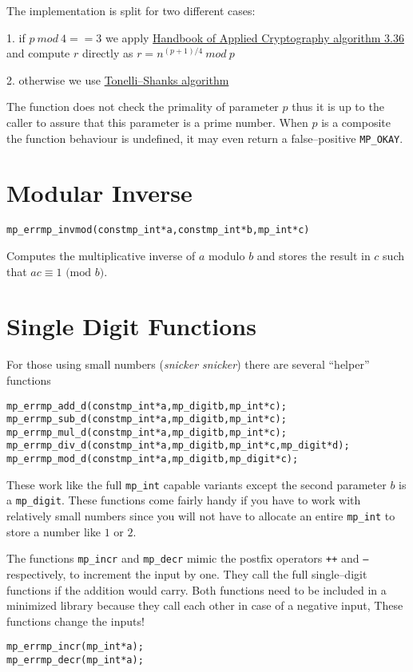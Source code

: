 \documentclass[synpaper]{book}
\def\mod{{\mathit\ mod\ }}
\begin{document}
The implementation is split for two different cases:

1. if $p \mod 4 == 3$ we apply \href{http://cacr.uwaterloo.ca/hac/}{Handbook of Applied
  Cryptography algorithm 3.36} and compute $r$ directly as $r = n^{(p+1)/4} \mod p$

2. otherwise we use \href{https://en.wikipedia.org/wiki/Tonelli-Shanks_algorithm}{Tonelli--Shanks
  algorithm}

The function does not check the primality of parameter $p$ thus it is up to the caller to assure
that this parameter is a prime number. When $p$ is a composite the function behaviour is undefined,
it may even return a false--positive \texttt{MP\_OKAY}.

\section{Modular Inverse}
\begin{alltt}
mp_err mp_invmod (const mp_int *a, const mp_int *b, mp_int *c)
\end{alltt}
Computes the multiplicative inverse of $a$ modulo $b$ and stores the result in $c$ such that
$ac \equiv 1 \mbox{ (mod }b\mbox{)}$.

\section{Single Digit Functions}

For those using small numbers (\textit{snicker snicker}) there are several ``helper'' functions

    
\begin{alltt}
mp_err mp_add_d(const mp_int *a, mp_digit b, mp_int *c);
mp_err mp_sub_d(const mp_int *a, mp_digit b, mp_int *c);
mp_err mp_mul_d(const mp_int *a, mp_digit b, mp_int *c);
mp_err mp_div_d(const mp_int *a, mp_digit b, mp_int *c, mp_digit *d);
mp_err mp_mod_d(const mp_int *a, mp_digit b, mp_digit *c);
\end{alltt}

These work like the full \texttt{mp\_int} capable variants except the second parameter $b$ is a
\texttt{mp\_digit}.  These functions come fairly handy if you have to work with relatively small numbers
since you will not have to allocate an entire \texttt{mp\_int} to store a number like $1$ or $2$.

The functions \texttt{mp\_incr} and \texttt{mp\_decr} mimic the postfix operators \texttt{++} and
\texttt{--} respectively, to increment the input by one. They call the full single--digit functions
if the addition would carry. Both functions need to be included in a minimized library because they
call each other in case of a negative input, These functions change the inputs!
 
\begin{alltt}
mp_err mp_incr(mp_int *a);
mp_err mp_decr(mp_int *a);
\end{alltt}
\end{document}

